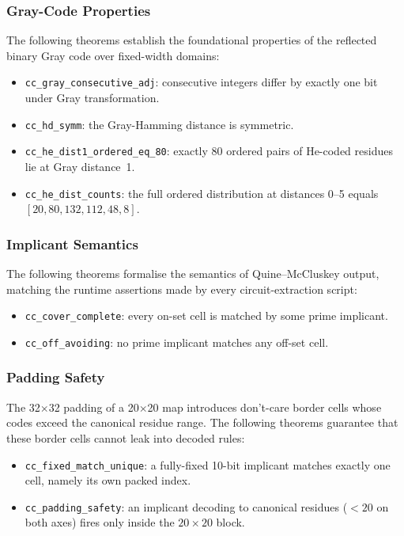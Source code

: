 \subsubsection{Gray-Code Properties}
The following theorems establish the foundational properties of the reflected
binary Gray code over fixed-width domains:
\begin{itemize}[nosep]
	\item \texttt{cc\_gray\_consecutive\_adj}: consecutive integers differ by
	      exactly one bit under Gray transformation.
	\item \texttt{cc\_hd\_symm}: the Gray-Hamming distance is symmetric.
	\item \texttt{cc\_he\_dist1\_ordered\_eq\_80}: exactly 80 ordered pairs of
	      He-coded residues lie at Gray distance~1.
	\item \texttt{cc\_he\_dist\_counts}: the full ordered distribution at
	      distances 0--5 equals $[20, 80, 132, 112, 48, 8]$.
\end{itemize}

\subsubsection{Implicant Semantics}
The following theorems formalise the semantics of Quine--McCluskey output,
matching the runtime assertions made by every circuit-extraction script:
\begin{itemize}[nosep]
	\item \texttt{cc\_cover\_complete}: every on-set cell is matched by some
	      prime implicant.
	\item \texttt{cc\_off\_avoiding}: no prime implicant matches any off-set
	      cell.
\end{itemize}

\subsubsection{Padding Safety}
The 32$\times$32 padding of a 20$\times$20 map introduces don't-care border
cells whose codes exceed the canonical residue range.  The following theorems
guarantee that these border cells cannot leak into decoded rules:
\begin{itemize}[nosep]
	\item \texttt{cc\_fixed\_match\_unique}: a fully-fixed 10-bit implicant
	      matches exactly one cell, namely its own packed index.
	\item \texttt{cc\_padding\_safety}: an implicant decoding to canonical
	      residues ($< 20$ on both axes) fires only inside the $20\times20$
	      block.
\end{itemize}

